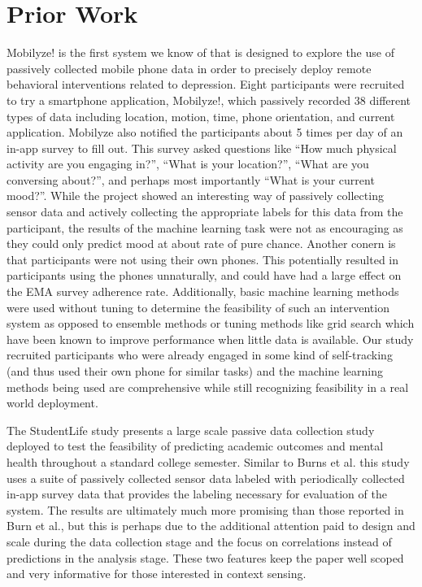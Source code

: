 \section{Prior Work}

Mobilyze! \cite{Burns2011} is the first system we know of that  is designed to explore the use of passively collected mobile phone data in order to precisely deploy remote behavioral interventions related to depression.  Eight participants were recruited to try a smartphone application, Mobilyze!, which passively recorded 38 different types of data including location, motion, time, phone orientation, and current application. Mobilyze also notified the participants about 5 times per day of an in-app survey to fill out.  This survey asked questions like “How much physical activity are you engaging in?”, “What is your location?”, “What are you conversing about?”, and perhaps most importantly “What is your current mood?”.  While the project showed an interesting way of passively collecting sensor data and actively collecting the appropriate labels for this data from the participant, the results of the machine learning task were not as encouraging as they could only predict mood at about rate of pure chance. Another conern is that participants were not using their own phones.  This potentially resulted in participants using the phones unnaturally, and could have had a large effect on the EMA survey adherence rate.  Additionally, basic machine learning methods were used without tuning to determine the feasibility of such an intervention system as opposed to ensemble methods or tuning methods like grid search which have been known to improve performance when little data is available.  Our study recruited participants who were already engaged in some kind of self-tracking (and thus used their own phone for similar tasks) and the machine learning methods being used are comprehensive while still recognizing feasibility in a real world deployment.

The StudentLife study presents a large scale passive data collection study deployed to test the feasibility of predicting academic outcomes and mental health throughout a standard college semester\cite{Wang}.  Similar to Burns et al. this study uses a suite of passively collected sensor data labeled with periodically collected in-app survey data that provides the labeling necessary for evaluation of the system.  The results are ultimately much more promising than those reported in Burn et al., but this is perhaps due to the additional attention paid to design and scale during the data collection stage and the focus on correlations instead of predictions in the analysis stage.  These two features keep the paper well scoped and very informative for those interested in context sensing.